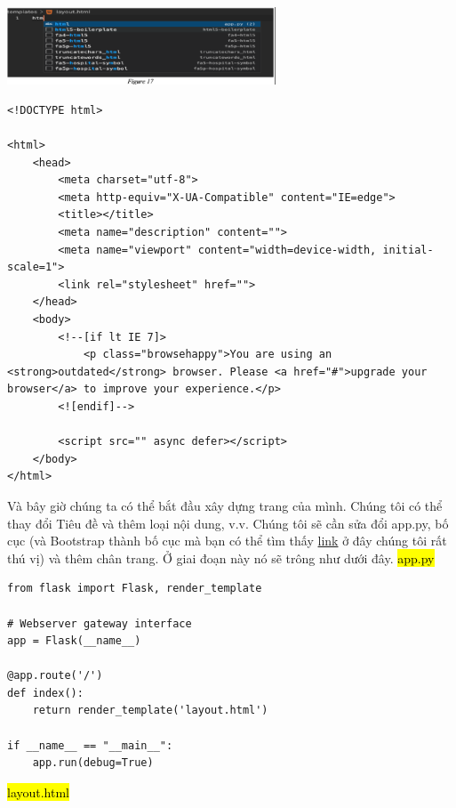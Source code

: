 \documentclass{article}
\begin{document}
\\
\includegraphics[width= 8cm]{img/img1/Screenshot 2024-11-20 194057.png}
\begin{verbatim}
<!DOCTYPE html>

<html>
    <head>
        <meta charset="utf-8">
        <meta http-equiv="X-UA-Compatible" content="IE=edge">
        <title></title>
        <meta name="description" content="">
        <meta name="viewport" content="width=device-width, initial-scale=1">
        <link rel="stylesheet" href="">
    </head>
    <body>
        <!--[if lt IE 7]>
            <p class="browsehappy">You are using an <strong>outdated</strong> browser. Please <a href="#">upgrade your browser</a> to improve your experience.</p>
        <![endif]-->

        <script src="" async defer></script>
    </body>
</html>
\end{verbatim}
Và bây giờ chúng ta có thể bắt đầu xây dựng trang của mình. Chúng tôi có thể thay đổi Tiêu đề và thêm loại nội dung, v.v. Chúng tôi sẽ cần sửa đổi app.py, bố cục (và Bootstrap thành bố cục mà bạn có thể tìm thấy \href{https://getbootstrap.com/docs/5.2/getting-started/introduction/.}{link}
ở đây chúng tôi rất thú vị) và thêm chân trang. Ở giai đoạn này nó sẽ trông như dưới đây.
\textcolor{white}{\hl{app.py}}
\begin{verbatim}
from flask import Flask, render_template

# Webserver gateway interface
app = Flask(__name__)

@app.route('/')
def index():
    return render_template('layout.html')

if __name__ == "__main__":
    app.run(debug=True)
\end{verbatim}

\textcolor{white}{\hl{layout.html}}
\end{document}
